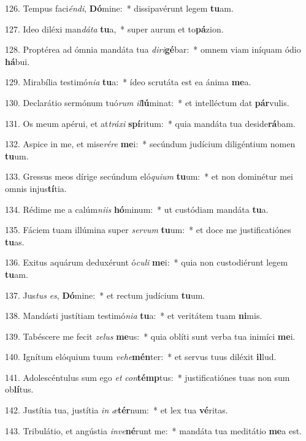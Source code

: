 126. Tempus faci\textit{én}\textit{di}, \textbf{Dó}mine:~*  dissipavérunt legem \textbf{tu}am.\

127. Ideo diléxi man\textit{dá}\textit{ta} \textbf{tu}a,~*  super aurum et to\textbf{pá}zion.\

128. Proptérea ad ómnia mandáta tua \textit{di}\textit{ri}\textbf{gé}bar:~*  omnem viam iníquam ódio \textbf{há}bui.\

129. Mirabília testimó\textit{ni}\textit{a} \textbf{tu}a:~*  ídeo scrutáta est ea ánima \textbf{me}a.\

130. Declarátio sermónum tuó\textit{rum} \textit{il}\textbf{lú}minat:~*  et intelléctum dat \textbf{pár}vulis.\

131. Os meum apérui, et at\textit{trá}\textit{xi} \textbf{spí}ritum:~*  quia mandáta tua deside\textbf{rá}bam.\

132. Aspice in me, et mise\textit{ré}\textit{re} \textbf{me}i:~*  secúndum judícium diligéntium nomen \textbf{tu}um.\

133. Gressus meos dírige secúndum eló\textit{qui}\textit{um} \textbf{tu}um:~*  et non dominétur mei omnis injus\textbf{tí}tia.\

134. Rédime me a calúm\textit{ni}\textit{is} \textbf{hó}minum:~*  ut custódiam mandáta \textbf{tu}a.\

135. Fáciem tuam illúmina super \textit{ser}\textit{vum} \textbf{tu}um:~*  et doce me justificatiónes \textbf{tu}as.\

136. Exitus aquárum deduxérunt ó\textit{cu}\textit{li} \textbf{me}i:~*  quia non custodiérunt legem \textbf{tu}am.\

137. Jus\textit{tus} \textit{es}, \textbf{Dó}mine:~*  et rectum judícium \textbf{tu}um.\

138. Mandásti justítiam testimó\textit{ni}\textit{a} \textbf{tu}a:~*  et veritátem tuam \textbf{ni}mis.\

139. Tabéscere me fecit \textit{ze}\textit{lus} \textbf{me}us:~*  quia oblíti sunt verba tua inimíci \textbf{me}i.\

140. Ignítum elóquium tuum \textit{ve}\textit{he}\textbf{mén}ter:~*  et servus tuus diléxit \textbf{il}lud.\

141. Adolescéntulus sum ego \textit{et} \textit{con}\textbf{témp}tus:~*  justificatiónes tuas non sum ob\textbf{lí}tus.\

142. Justítia tua, justítia \textit{in} \textit{æ}\textbf{tér}num:~*  et lex tua \textbf{vé}ritas.\

143. Tribulátio, et angústia \textit{in}\textit{ve}\textbf{né}runt me:~*  mandáta tua meditátio \textbf{me}a est.\

